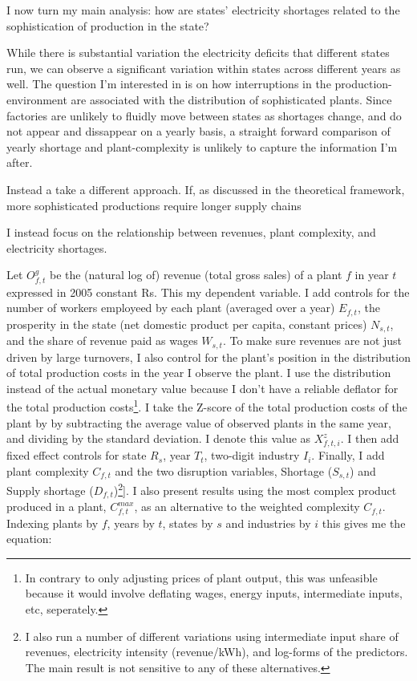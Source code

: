 \documentclass[11pt]{article}
\begin{document}
I now turn my main analysis: how are states' electricity shortages related to the sophistication of production in the state? 

While there is substantial variation the electricity deficits that different states run, we can observe a significant variation within states across different years as well. The question I'm interested in is on how interruptions in the production-environment are associated with the distribution of sophisticated plants. Since factories are unlikely to fluidly move between states as shortages change, and do not appear and dissappear on a yearly basis, a straight forward comparison of yearly shortage and plant-complexity is unlikely to capture the information I'm after. 

Instead a take a different approach. If, as discussed in the theoretical framework, more sophisticated productions require longer supply chains 

I instead focus on the relationship between revenues, plant complexity, and electricity shortages.

Let $O^{g}_{f,t}$ be the (natural log of) revenue (total gross sales) of a plant $f$ in year $t$ expressed in 2005 constant Rs. This my dependent variable. I add controls for the number of workers employeed by each plant (averaged over a year) $E_{f,t}$, the prosperity in the state (net domestic product per capita, constant prices) $N_{s,t}$, and the share of revenue paid as wages $W_{s,t}$. To make sure revenues are not just driven by large turnovers, I also control for the plant's position in the distribution of total production costs in the year I observe the plant. I use the distribution instead of the actual monetary value because I don't have a reliable deflator for the total production costs\footnote{In contrary to only adjusting prices of plant output, this was unfeasible because it would involve deflating wages, energy inputs, intermediate inputs, etc, seperately.}. I take the Z-score of the total production costs of the plant by by subtracting the average value of observed plants in the same year, and dividing by the standard deviation. I denote this value as $X^{z}_{f,t,i}$. I then add fixed effect controls for state $R_{s}$, year $T_{t}$, two-digit industry $I_i$. Finally, I add plant complexity $C_{f,t}$ and the two disruption variables, Shortage ($S_{s,t}$) and Supply shortage ($D_{f,t}$)\footnote{I also run a number of different variations using intermediate input share of revenues, electricity intensity (revenue/kWh), and log-forms of the predictors. The main result is not sensitive to any of these alternatives.}]. I also present results using the most complex product produced in a plant, $C^{max}_{f,t}$, as an alternative to the weighted complexity $C_{f,t}$. Indexing plants by $f$, years by $t$, states by $s$ and industries by $i$ this gives me the equation:
\end{document}
